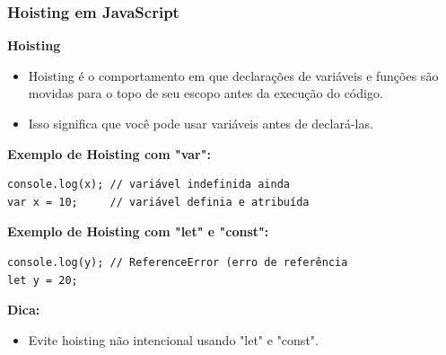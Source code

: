 \documentclass[13pt, xcolor={dvipsnames,svgnames}, portuguese]{beamer}
\begin{document}
\begin{frame}[fragile]
\frametitle{Hoisting em JavaScript}

\textbf{Hoisting}

\begin{itemize}
  \item Hoisting é o comportamento em que declarações de variáveis e funções são movidas para o topo de seu escopo antes da execução do código.
  \item Isso significa que você pode usar variáveis antes de declará-las.
\end{itemize}

\textbf{Exemplo de Hoisting com "var":}

\begin{verbatim}
console.log(x); // variável indefinida ainda
var x = 10;     // variável definia e atribuída
\end{verbatim}

\textbf{Exemplo de Hoisting com "let" e "const":}

\begin{verbatim}
console.log(y); // ReferenceError (erro de referência
let y = 20;
\end{verbatim}

\textbf{Dica:}

\begin{itemize}
  \item Evite hoisting não intencional usando "let" e "const".
\end{itemize}

\end{frame}

\end{document}
